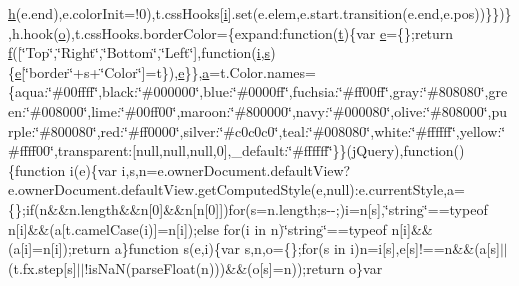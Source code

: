 \begin{DoxyCompactItemize}
\hyperlink{jquery-ui_8min_8js_a79fe0eb780a2a4b5543b4dddf8b6188a}{h}(e.\+end),e.\+color\+Init=!0),t.\+css\+Hooks\mbox{[}\hyperlink{jquery-ui_8min_8js_a83e0f8a79d7f496783fc7527db51773e}{i}\mbox{]}.set(e.\+elem,e.\+start.\+transition(e.\+end,e.\+pos))\}\})\},h.\+hook(\hyperlink{fullpage_2plugin_8min_8js_a4afc7c854f61c136d7bcfa8997651b88}{o}),t.\+css\+Hooks.\+border\+Color=\{expand\+:function(\hyperlink{jquery-ui_8min_8js_acf335ef347969ef6dc8387e680fb289e}{t})\{var \hyperlink{jquery-ui_8min_8js_abea95a4e94bc6f4151d5683d4c12c3f4}{e}=\{\};return \hyperlink{jquery-ui_8min_8js_a9cf09a2972472098a4c689fd988f4dfc}{f}(\mbox{[}\char`\"{}Top\char`\"{},\char`\"{}Right\char`\"{},\char`\"{}Bottom\char`\"{},\char`\"{}Left\char`\"{}\mbox{]},function(\hyperlink{jquery-ui_8min_8js_a83e0f8a79d7f496783fc7527db51773e}{i},\hyperlink{paste_2plugin_8min_8js_a43ae144ee2a4e493fea41ca42f795b14}{s})\{\hyperlink{jquery-ui_8min_8js_abea95a4e94bc6f4151d5683d4c12c3f4}{e}\mbox{[}\char`\"{}border\char`\"{}+s+\char`\"{}Color\char`\"{}\mbox{]}=t\}),\hyperlink{jquery-ui_8min_8js_abea95a4e94bc6f4151d5683d4c12c3f4}{e}\}\},\hyperlink{_chart_8min_8js_aef3b685c08bc6c76c8e729bd0e93901d}{a}=t.\+Color.\+names=\{aqua\+:\char`\"{}\#00ffff\char`\"{},black\+:\char`\"{}\#000000\char`\"{},blue\+:\char`\"{}\#0000ff\char`\"{},fuchsia\+:\char`\"{}\#ff00ff\char`\"{},gray\+:\char`\"{}\#808080\char`\"{},green\+:\char`\"{}\#008000\char`\"{},lime\+:\char`\"{}\#00ff00\char`\"{},maroon\+:\char`\"{}\#800000\char`\"{},navy\+:\char`\"{}\#000080\char`\"{},olive\+:\char`\"{}\#808000\char`\"{},purple\+:\char`\"{}\#800080\char`\"{},red\+:\char`\"{}\#ff0000\char`\"{},silver\+:\char`\"{}\#c0c0c0\char`\"{},teal\+:\char`\"{}\#008080\char`\"{},white\+:\char`\"{}\#ffffff\char`\"{},yellow\+:\char`\"{}\#ffff00\char`\"{},transparent\+:\mbox{[}null,null,null,0\mbox{]},\+\_\+default\+:\char`\"{}\#ffffff\char`\"{}\}\}(j\+Query),function()\{function i(e)\{var i,s,n=e.\+owner\+Document.\+default\+View?e.\+owner\+Document.\+default\+View.\+get\+Computed\+Style(e,null)\+:e.\+current\+Style,a=\{\};if(n\&\&n.\+length\&\&n\mbox{[}0\mbox{]}\&\&n\mbox{[}n\mbox{[}0\mbox{]}\mbox{]})for(s=n.\+length;s-\/-\/;)i=n\mbox{[}s\mbox{]},\char`\"{}string\char`\"{}==typeof n\mbox{[}i\mbox{]}\&\&(a\mbox{[}t.\+camel\+Case(i)\mbox{]}=n\mbox{[}i\mbox{]});else for(i in n)\char`\"{}string\char`\"{}==typeof n\mbox{[}i\mbox{]}\&\&(a\mbox{[}i\mbox{]}=n\mbox{[}i\mbox{]});return a\}function s(e,i)\{var s,n,o=\{\};for(s in i)n=i\mbox{[}s\mbox{]},e\mbox{[}s\mbox{]}!==n\&\&(a\mbox{[}s\mbox{]}$\vert$$\vert$(t.\+fx.\+step\mbox{[}s\mbox{]}$\vert$$\vert$!is\+Na\+N(parse\+Float(n)))\&\&(o\mbox{[}s\mbox{]}=n));return o\}var 
\end{DoxyCompactItemize}
